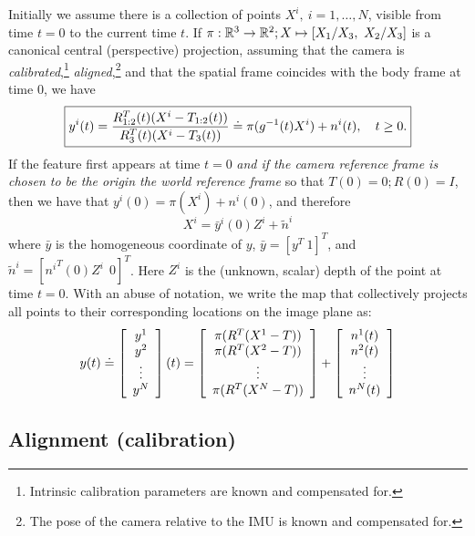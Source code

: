 Initially we assume there is a collection of points $X^i, \ i = 1, \dots, N$, visible from time $t=0$ to the current time $t$. If $\pi:\mathbb{R}^3 \rightarrow \mathbb{R}^2; X \mapsto [X_1/X_3, \ X_2/X_3]$ is a canonical central (perspective) projection, assuming that the camera is {\em calibrated},\footnote{Intrinsic calibration parameters are known and compensated for.} {\em aligned},\footnote{The pose of the camera relative to the IMU is known and compensated for.} and that the spatial frame coincides with the body frame at time $0$, we have
\begin{equation}
\boxed{y^i(t) = {\color{black} \frac{R^T_{1:2}(t) (X^i - T_{1:2}(t))}{R^T_{3}(t)( X^i - T_3(t))}} \doteq  \pi(g^{-1}(t)X^i) + n^i(t), ~~~ {\color{black} t \ge 0.}}
\label{eq-y}
\end{equation}
If the feature first appears at time $t = 0$ {\em and if the camera reference frame is chosen to be the origin the world reference frame} so that $T(0) = 0; R(0) = I$, then we have that $y^i(0) = \pi(X^i) +n^i(0)$, and therefore
\begin{equation}
\boxed{X^i = \bar y^i(0)Z^i + \tilde n^i}
\label{eq-trian}
\end{equation}
where $\bar y$ is the homogeneous coordinate of $y$, $\bar y = [y^T \ 1]^T$, and $\tilde n^i = [{n^i}^T(0)Z^i \ \  0]^T$. Here $Z^i$ is the (unknown, scalar) depth of the point at time $t = 0$. With an abuse of notation, we write the map that collectively projects all points to their corresponding locations on the image plane as:
\begin{equation}
y(t) \doteq \ba{c}
y^1 \\ y^2 \\ \vdots \\ y^N \ea (t)
 = \ba{c}
\pi(R^T(X^1 - T)) \\
\pi(R^T(X^2- T)) \\
\vdots\\
\pi(R^T( X^N- T))
\ea
+ \ba{c}
n^1(t) \\ n^2(t) \\ \vdots \\ n^N(t) \ea 
\label{eq-vis}
\end{equation}

\subsection{Alignment (calibration)} 

